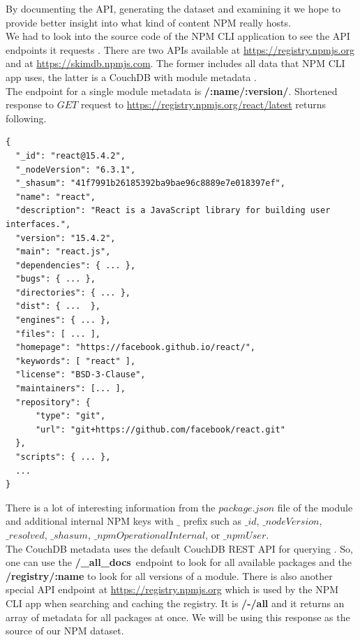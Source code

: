 \documentclass[thesis=M,english]{FITthesis}[2012/10/20]
\begin{document}
By documenting the API, generating the dataset and examining it we hope to provide better insight into what kind of content NPM really hosts. \\

We had to look into the source code of the NPM CLI application to see the API endpoints it requests \cite{npm_gh_api}. There are two APIs available at \url{https://registry.npmjs.org} and at \url{https://skimdb.npmjs.com}. The former includes all data that NPM CLI app uses, the latter is a CouchDB with module metadata \cite{npm_arch}. \\

The endpoint for a single module metadata is \textbf{/:name/:version/}. Shortened response to $GET$ request to \url{https://registry.npmjs.org/react/latest} returns following. \\

\lstset{title=NPM API response with module metadata}
\begin{lstlisting}[basicstyle=\tiny]
{   
  "_id": "react@15.4.2",
  "_nodeVersion": "6.3.1",
  "_shasum": "41f7991b26185392ba9bae96c8889e7e018397ef",
  "name": "react",
  "description": "React is a JavaScript library for building user interfaces.",
  "version": "15.4.2",
  "main": "react.js",
  "dependencies": { ... },
  "bugs": { ... },
  "directories": { ... },
  "dist": { ...  },
  "engines": { ... },
  "files": [ ... ],
  "homepage": "https://facebook.github.io/react/",
  "keywords": [ "react" ],
  "license": "BSD-3-Clause",
  "maintainers": [... ],
  "repository": {
      "type": "git",
      "url": "git+https://github.com/facebook/react.git"
  },
  "scripts": { ... },
  ...
}
\end{lstlisting}


There is a lot of interesting information from the $package.json$ file of the module \cite{npm_packagejson} and additional internal NPM keys with $\_$ prefix such as $\_id$, $\_nodeVersion$, $\_resolved$, $\_shasum$, $\_npmOperationalInternal$, or $\_npmUser$. \\

The CouchDB metadata uses the default CouchDB REST API for querying \cite{couchdb_api}. So, one can use the \textbf{/\_all\_docs} endpoint to look for all available packages and the \textbf{/registry/:name} to look for all versions of a module. There is also another special API endpoint at \url{https://registry.npmjs.org} which is used by the NPM CLI app when searching and caching the registry. It is \textbf{/-/all} and it returns an array of metadata for all packages at once. We will be using this response as the source of our NPM dataset. \\
\end{document}

